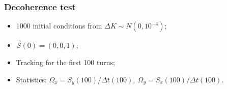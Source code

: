 \documentclass[pdf]{beamer}
\begin{document}

	\begin{frame}
		\frametitle{Decoherence test}
		\begin{itemize}
			\item 1000 initial conditions from $\Delta K \sim N(0, 10^{-4})$;
			\item $\vec{S}(0) = (0,0,1)$;
			\item Tracking for the first 100 turns;
			\item Statistics: $\Omega_x = S_y(100) / \Delta t(100), ~ \Omega_y = S_x(100) / \Delta t(100)$.
		\end{itemize}
	\end{frame}
\end{document}
